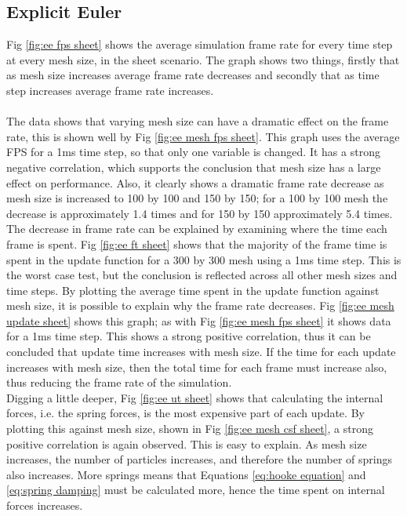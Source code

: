 \subsection{Explicit Euler}
Fig \ref{fig:ee fps sheet} shows the average simulation frame rate for every time step at every mesh size, in the sheet scenario. The graph shows two things, firstly that as mesh size increases average frame rate decreases and secondly that as time step increases average frame rate increases.
\\\\The data shows that varying mesh size can have a dramatic effect on the frame rate, this is shown well by Fig \ref{fig:ee mesh fps sheet}. This graph uses the average FPS for a 1ms time step, so that only one variable is changed. It has a strong negative correlation, which supports the conclusion that mesh size has a large effect on performance. Also, it clearly shows a dramatic frame rate decrease as mesh size is increased to 100 by 100 and 150 by 150; for a 100 by 100 mesh the decrease is approximately 1.4 times and for 150 by 150 approximately 5.4 times.
\\The decrease in frame rate can be explained by examining where the time each frame is spent. Fig \ref{fig:ee ft sheet} shows that the majority of the frame time is spent in the update function for a 300 by 300 mesh using a 1ms time step. This is the worst case test, but the conclusion is reflected across all other mesh sizes and time steps. By plotting the average time spent in the update function against mesh size, it is possible to explain why the frame rate decreases. Fig \ref{fig:ee mesh update sheet} shows this graph; as with Fig \ref{fig:ee mesh fps sheet} it shows data for a 1ms time step. This shows a strong positive correlation, thus it can be concluded that update time increases with mesh size. If the time for each update increases with mesh size, then the total time for each frame must increase also, thus reducing the frame rate of the simulation. 
\\Digging a little deeper, Fig \ref{fig:ee ut sheet} shows that calculating the internal forces, i.e. the spring forces, is the most expensive part of each update. By plotting this against mesh size, shown in Fig \ref{fig:ee mesh csf sheet}, a strong positive correlation is again observed. This is easy to explain. As mesh size increases, the number of particles increases, and therefore the number of springs also increases. More springs means that Equations \ref{eq:hooke equation} and \ref{eq:spring damping} must be calculated more, hence the time spent on internal forces increases.
